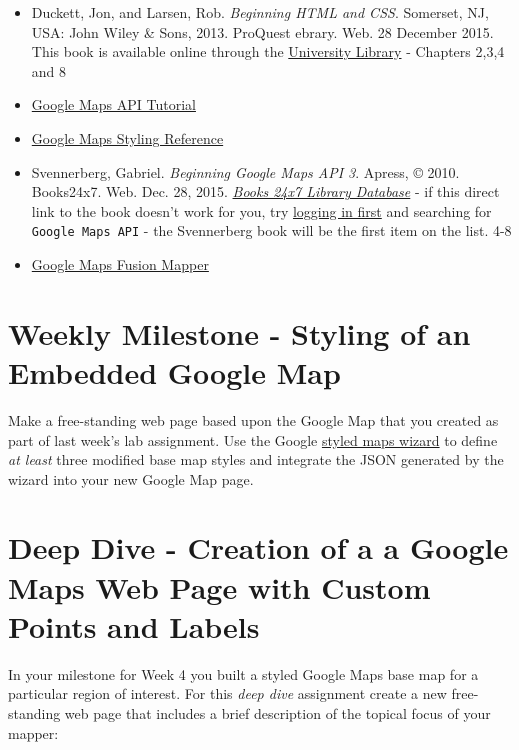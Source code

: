\documentclass[]{book}
\begin{document}
\begin{itemize}
\item
  Duckett, Jon, and Larsen, Rob. \emph{Beginning HTML and CSS}.
  Somerset, NJ, USA: John Wiley \& Sons, 2013. ProQuest ebrary. Web. 28
  December 2015. This book is available online through the
  \href{http://site.ebrary.com.libproxy.unm.edu/lib/unma/detail.action?docID=10667426}{University
  Library} - Chapters 2,3,4 and 8
\item
  \href{http://code.google.com/apis/maps/documentation/javascript/tutorial.html}{Google
  Maps API Tutorial}
\item
  \href{https://developers.google.com/maps/documentation/javascript/styling}{Google
  Maps Styling Reference}
\item
  Svennerberg, Gabriel. \emph{Beginning Google Maps API 3}. Apress, ©
  2010. Books24x7. Web. Dec. 28, 2015.
  \href{http://library.books24x7.com.libproxy.unm.edu/toc.aspx?bookid=36390\&refid=SVA3S}{\emph{Books
  24x7 Library Database}} - if this direct link to the book doesn't work
  for you, try
  \href{http://library.unm.edu/applications/dam/plink.php?db_id=238}{logging
  in first} and searching for \texttt{Google\ Maps\ API} - the
  Svennerberg book will be the first item on the list. 4-8
\item
  \href{http://earth.google.com/outreach/tutorial_fusion_yourowndata.html}{Google
  Maps Fusion Mapper}
\end{itemize}

\section{Weekly Milestone - Styling of an Embedded Google
Map}\label{week04-milestone}

Make a free-standing web page based upon the Google Map that you created
as part of last week's lab assignment. Use the Google
\href{http://gmaps-samples-v3.googlecode.com/svn/trunk/styledmaps/wizard/index.html}{styled
maps wizard} to define \emph{at least} three modified base map styles
and integrate the JSON generated by the wizard into your new Google Map
page.

\section{Deep Dive - Creation of a a Google Maps Web Page with Custom
Points and Labels}\label{week04-deepDive}

In your milestone for Week 4 you built a styled Google Maps base map for
a particular region of interest. For this \emph{deep dive} assignment
create a new free-standing web page that includes a brief description of
the topical focus of your mapper:
\end{document}
